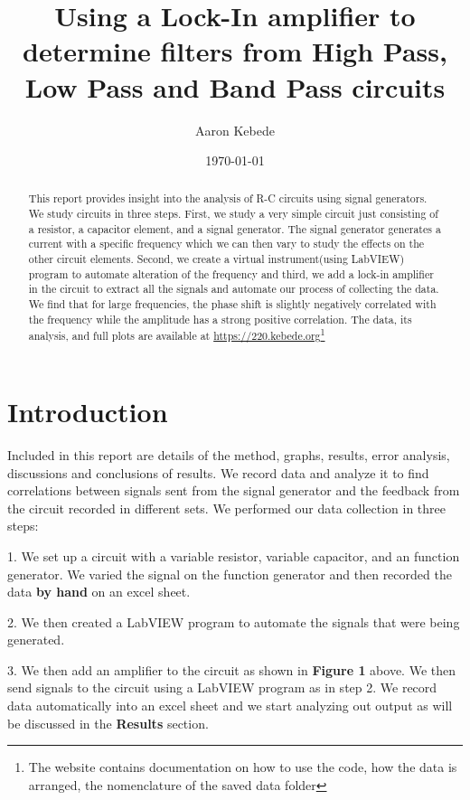 \documentclass[twocolumn]{article}\usepackage[english]{babel}
\title{Using a Lock-In amplifier to determine filters from High Pass, Low Pass and Band Pass circuits }
\author{Aaron Kebede}
\date{\today}
\begin{document}
\maketitle
\begin{abstract}

This report provides insight into the analysis of R-C circuits using signal generators. We study circuits in three steps. First, we study a very simple circuit just consisting of a resistor, a capacitor element, and a signal generator. The signal generator generates a current with a specific frequency which we can then vary to study the effects on the other circuit elements. Second, we create a virtual instrument(using LabVIEW) program to automate alteration of the frequency and third, we add a lock-in amplifier in the circuit to extract all the signals and automate our process of collecting the data. We find that for large frequencies, the phase shift is slightly negatively correlated with the frequency while the amplitude has a strong positive correlation. The data, its analysis, and full plots are available at \url{https://220.kebede.org}\footnote[1]{The website contains documentation on how to use the code, how the data is arranged, the nomenclature of the saved data folder}

\end{abstract}

\section{Introduction}

Included in this report are details of the method, graphs, results, error analysis, discussions and conclusions of results. We record data and analyze it to find correlations between signals sent from the signal generator and the feedback from the circuit recorded in different sets.  
\newline
We performed our data collection in three steps:
\newline
\begin{Steps}
 \item{1. We set up a circuit with a variable resistor, variable capacitor, and  an function generator. We varied the signal on the function generator and then recorded the data \textbf{by hand} on an excel sheet.} \newline{}
 \item{2. We then created a LabVIEW program to automate the signals that were being generated. } \newline{}
 \item{3. We then add an amplifier to the circuit as shown in \textbf{Figure 1} above. We then send signals to the circuit using a LabVIEW program as in step 2. We record data automatically into an excel sheet and we start analyzing out output as will be discussed in the \textbf{Results} section.}
\end{Steps}
\end{document}
